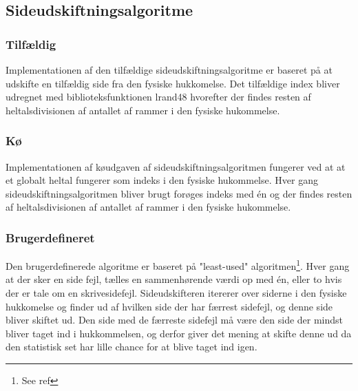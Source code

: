\subsection{Sideudskiftningsalgoritme}
\label{pagereplacementalgorithms}
\subsubsection{Tilfældig}
Implementationen af den tilfældige sideudskiftningsalgoritme er baseret på at udskifte en tilfældig side fra den fysiske hukkomelse. Det tilfældige index bliver udregnet med biblioteksfunktionen lrand48 hvorefter der findes resten af heltalsdivisionen af antallet af rammer i den fysiske hukommelse.

\subsubsection{Kø}
Implementationen af køudgaven af sideudskiftningsalgoritmen fungerer ved at at et globalt heltal fungerer som indeks i den fysiske hukommelse. Hver gang sideudskiftningsalgoritmen bliver brugt forøges indeks med én og der findes resten af heltalsdivisionen af antallet af rammer i den fysiske hukommelse.

\subsubsection{Brugerdefineret}
Den brugerdefinerede algoritme er baseret på "least-used" algoritmen\footnote{See ref}. Hver gang at der sker en side fejl, tælles en sammenhørende værdi op med én, eller to hvis der er tale om en skrivesidefejl. Sideudskifteren itererer over siderne i den fysiske hukkomelse og finder ud af hvilken side der har færrest sidefejl, og denne side bliver skiftet ud. Den side med de færreste sidefejl må være den side der mindst bliver taget ind i hukkommelsen, og derfor giver det mening at skifte denne ud da den statistisk set har lille chance for at blive taget ind igen.